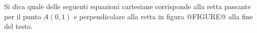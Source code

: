 Si dica quale delle seguenti equazioni cartesiane corrisponde alla retta passante per il punto \( \displaystyle A\left(0,1\right)\) e
perpendicolare alla retta in figura
@FIGURE@ alla fine del testo. 